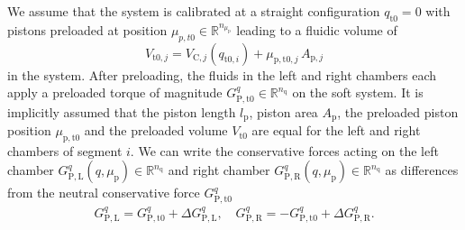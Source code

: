 We assume that the system is calibrated at a straight configuration $q_{\mathrm{t}0} = 0$ with pistons preloaded at position $\mu_{p,t0} \in \mathbb{R}^{n_{\mu_\mathrm{p}}}$ leading to a fluidic volume of
 \begin{equation}
     V_{\mathrm{t}0,j} = V_{\mathrm{C},j}(q_{\mathrm{t}0,i}) + \mu_{\mathrm{p},\mathrm{t}0,j} \, A_{\mathrm{p},j}
 \end{equation}
in the system. After preloading, the fluids in the left and right chambers each apply a preloaded torque of magnitude $G_{\mathrm{P},\mathrm{t}0}^{q} \in \mathbb{R}^{n_\mathrm{q}}$ on the soft system.
It is implicitly assumed that the piston length $l_\mathrm{p}$, piston area $A_\mathrm{p}$, the preloaded piston position $\mu_{\mathrm{p},\mathrm{t}0}$ and the preloaded volume $V_{\mathrm{t}0}$ are equal for the left and right chambers of segment $i$.
We can write the conservative forces acting on the left chamber $G_{\mathrm{P},\mathrm{L}}^q(q, \mu_\mathrm{p}) \in \mathbb{R}^{n_\mathrm{q}}$ and right chamber $G_{\mathrm{P},\mathrm{R}}^q(q, \mu_\mathrm{p}) \in \mathbb{R}^{n_\mathrm{q}}$ as differences from the neutral conservative force $G_{\mathrm{P},\mathrm{t}0}^{q}$
\begin{equation}
\begin{split}
    G_{\mathrm{P},\mathrm{L}}^q = G_{\mathrm{P},\mathrm{t}0}^{q} + \Delta G_{\mathrm{P},\mathrm{L}}^q,
    \quad
    G_{\mathrm{P},\mathrm{R}}^q = - G_{\mathrm{P},\mathrm{t}0}^{q} + \Delta G_{\mathrm{P},\mathrm{R}}^q.
\end{split}
\end{equation}
